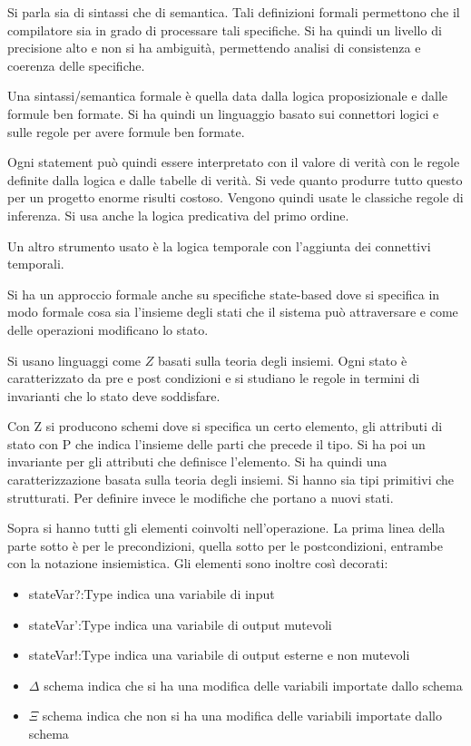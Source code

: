 Si parla sia di sintassi che di semantica. Tali definizioni formali permettono
che il compilatore sia in grado di processare tali specifiche. Si ha quindi un
livello di precisione alto e non si ha ambiguità, permettendo analisi di consistenza
e coerenza delle specifiche.

Una sintassi/semantica formale è quella data dalla logica proposizionale e dalle
formule ben formate. Si ha quindi un linguaggio basato sui connettori logici e
sulle regole per avere formule ben formate.

Ogni statement può quindi essere interpretato con il valore di verità con le
regole definite dalla logica e dalle tabelle di verità. Si vede quanto produrre
tutto questo per un progetto enorme risulti costoso. Vengono quindi usate le
classiche regole di inferenza. Si usa anche la logica predicativa del primo ordine.

Un altro strumento usato è la logica temporale con l'aggiunta dei connettivi temporali.

Si ha un approccio formale anche su specifiche state-based dove si specifica in
modo formale cosa sia l'insieme degli stati che il sistema può attraversare e
come delle operazioni modificano lo stato.

Si usano linguaggi come $Z$ basati sulla teoria degli insiemi. Ogni stato è
caratterizzato da pre e post condizioni e si studiano le regole in termini di
invarianti che lo stato deve soddisfare.

Con Z si producono schemi dove si specifica un certo elemento, gli attributi di
stato con P che indica l'insieme delle parti che precede il tipo. Si ha poi un
invariante per gli attributi che definisce l'elemento. Si ha quindi una caratterizzazione
basata sulla teoria degli insiemi. Si hanno sia tipi primitivi che strutturati.
Per definire invece le modifiche che portano a nuovi stati.

Sopra si hanno tutti gli elementi coinvolti nell'operazione. La prima linea della
parte sotto è per le precondizioni, quella sotto per le postcondizioni, entrambe
con la notazione insiemistica. Gli elementi sono inoltre così decorati:
\begin{itemize}
    \item stateVar?:Type indica una variabile di input
    \item stateVar':Type indica una variabile di output mutevoli
    \item stateVar!:Type indica una variabile di output esterne e non mutevoli
    \item $\Delta$ schema indica che si ha una modifica delle variabili importate
          dallo schema
    \item $\Xi$ schema indica che non si ha una modifica delle variabili importate
          dallo schema
\end{itemize}

